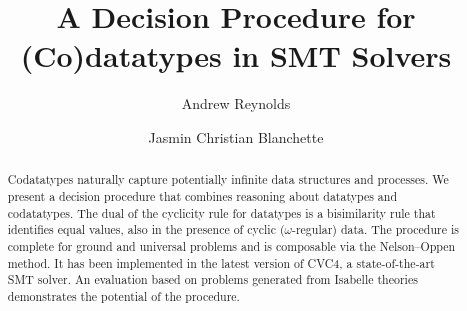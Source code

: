 \newcommand{\thO}{T_{o}}
\newcommand{\thD}{T_{d}}

\newcommand\Types{\mathcal{Y}}
\newcommand\Funcs{\mathcal{F}}

\newcommand\Data{\Types_{\mathrm{dt}}}
\newcommand\Codata{\Types_{\mathrm{codt}}}
\newcommand\Nondata{\Types_{\mathrm{ord}}}

\newcommand\Ctr{\Funcs_{\mathrm{ctr}}}
\newcommand\Sel{\Funcs_{\mathrm{sel}}}

\newcommand\vthinspace{\kern+0.083333em}
\newcommand\negvthinspace{\kern-0.083333em}

\usepackage[
   a4paper,
   pdftex,
   pdftitle={A Decision Procedure for (Co)datatypes in SMT Solvers},
   pdfauthor={Andrew Reynolds and Jasmin Christian Blanchette},
   pdfkeywords={},
   pdfborder={0 0 0},
   draft=false,
   bookmarksnumbered,
   bookmarks,
   bookmarksdepth=2,
   bookmarksopenlevel=2,
   bookmarksopen]{hyperref}


\global\def\figurename{Figure}


\makeatletter
\ps@myheadings
\makeatother







\title{A Decision Procedure for (Co)datatypes in SMT Solvers}

\author {Andrew Reynolds \and Jasmin Christian Blanchette}

\maketitle

\begin{abstract}
Codatatypes naturally capture potentially infinite data structures and
processes. We present a decision procedure that combines reasoning about
datatypes and codatatypes. The dual of the cyclicity rule for datatypes is a
bisimilarity rule that identifies equal values, also in the presence of cyclic
($\omega$-regular) data. The procedure is complete for ground and universal
problems and is composable via the Nelson--Oppen method. It has been
implemented in the latest version of CVC4, a state-of-the-art SMT solver. An
evaluation based on problems generated from Isabelle theories demonstrates the
potential of the procedure.
\end{abstract}

